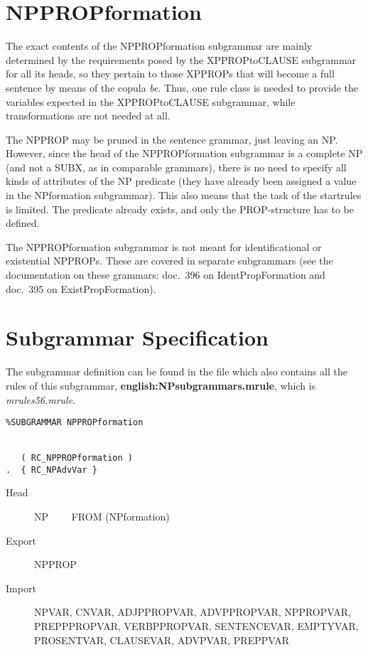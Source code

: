 \newpage
\section{NPPROPformation}
The exact contents of the NPPROPformation subgrammar are mainly determined 
by the requirements posed by the XPPROPtoCLAUSE subgrammar for all its heads,
so they pertain to those XPPROPs that will become a full sentence by means of 
the copula {\em be\/}.
Thus, one rule class is needed to provide the variables expected in the 
XPPROPtoCLAUSE subgrammar, while transformations are not needed at all.

The NPPROP may be pruned in the sentence grammar, just leaving an
NP. However, since the head of the NPPROPformation subgrammar is a complete 
NP (and not a SUBX, as in comparable grammars), there is no need to specify 
all kinds of attributes of the NP predicate (they have already been assigned a 
value in the NPformation subgrammar). This also means that the task of 
the startrules is limited. The predicate already exists, and only the 
PROP-structure has to be defined.

The NPPROPformation subgrammar is not meant for identificational or 
existential NPPROPs. These are covered in separate subgrammars (see the 
documentation on these grammars: doc.\ 396 on IdentPropFormation and doc.\ 395 
on ExistPropFormation).

\section{Subgrammar Specification}
The subgrammar definition can be found in the file which also contains all the 
rules of this subgrammar, {\bf english:NPsubgrammars.mrule}, 
which is {\em mrules56.mrule\/}.

\begin{verbatim}
%SUBGRAMMAR NPPROPformation


   ( RC_NPPROPformation )
.  { RC_NPAdvVar }

\end{verbatim}

\begin{description}
  \item[Head]  NP \ \ \ \ FROM (NPformation)
  \item[Export] NPPROP
  \item[Import] NPVAR, CNVAR, ADJPPROPVAR, ADVPPROPVAR, NPPROPVAR, 
PREPPPROPVAR, VERBPPROPVAR, SENTENCEVAR, EMPTYVAR, PROSENTVAR, CLAUSEVAR,
ADVPVAR, PREPPVAR 
\end{description}

